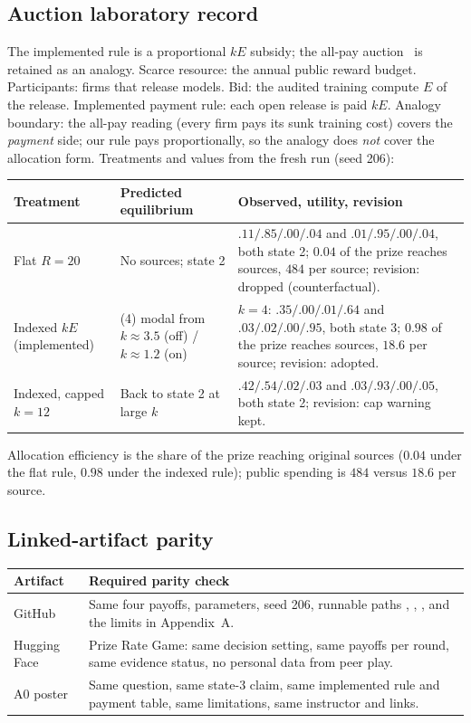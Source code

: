 \subsection{Auction laboratory record}
The implemented rule is a proportional $kE$ subsidy; the all-pay auction~\cite{baye1996} is retained as an analogy. Scarce resource: the annual public reward budget. Participants: firms that release models. Bid: the audited training compute $E$ of the release. Implemented payment rule: each open release is paid $kE$. Analogy boundary: the all-pay reading (every firm pays its sunk training cost) covers the \emph{payment} side; our rule pays proportionally, so the analogy does \emph{not} cover the allocation form. Treatments and values from the fresh run (seed 206):
\par\smallskip
\begin{tabularx}{\columnwidth}{@{}p{1.5cm}YY@{}}\toprule
\textbf{Treatment}&\textbf{Predicted equilibrium}&\textbf{Observed, utility, revision}\\\midrule
Flat $R=20$&No sources; state 2&$.11/.85/.00/.04$ and $.01/.95/.00/.04$, both state 2; $0.04$ of the prize reaches sources, $484$ per source; revision: dropped (counterfactual).\\
Indexed $kE$ (implemented)&(4) modal from $k\approx3.5$ (off) / $k\approx1.2$ (on)&$k=4$: $.35/.00/.01/.64$ and $.03/.02/.00/.95$, both state 3; $0.98$ of the prize reaches sources, $18.6$ per source; revision: adopted.\\
Indexed, capped $k=12$&Back to state 2 at large $k$&$.42/.54/.02/.03$ and $.03/.93/.00/.05$, both state 2; revision: cap warning kept.\\\bottomrule
\end{tabularx}
\par\smallskip
\noindent Allocation efficiency is the share of the prize reaching original sources ($0.04$ under the flat rule, $0.98$ under the indexed rule); public spending is $484$ versus $18.6$ per source.

\subsection{Linked-artifact parity}
\begin{tabularx}{\columnwidth}{@{}p{1.75cm}Y@{}}\toprule
\textbf{Artifact}&\textbf{Required parity check}\\\midrule
GitHub&Same four payoffs, parameters, seed 206, runnable paths , , , and the limits in Appendix~A.\\
Hugging Face&Prize Rate Game: same decision setting, same payoffs per round, same evidence status, no personal data from peer play.\\
A0 poster&Same question, same state-3 claim, same implemented rule and payment table, same limitations, same instructor and links.\\\bottomrule
\end{tabularx}

